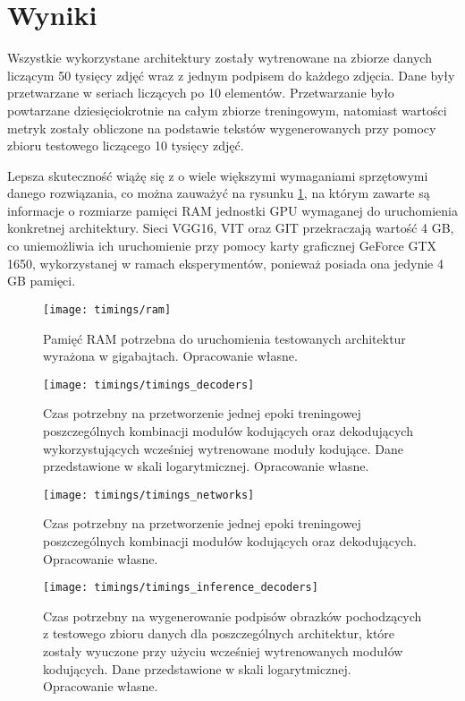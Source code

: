 \newpage %

\section{Wyniki}
Wszystkie wykorzystane architektury zostały wytrenowane na zbiorze danych liczącym 50 tysięcy zdjęć wraz z jednym podpisem do każdego zdjęcia. Dane były przetwarzane w seriach liczących po 10 elementów. Przetwarzanie było powtarzane dziesięciokrotnie na całym zbiorze treningowym, natomiast wartości metryk zostały obliczone na podstawie tekstów wygenerowanych przy pomocy zbioru testowego liczącego 10 tysięcy zdjęć.

Lepsza skuteczność wiążę się z o wiele większymi wymaganiami sprzętowymi danego rozwiązania, co można zauważyć na rysunku \ref{fig:memory}, na którym zawarte są informacje o rozmiarze pamięci RAM jednostki GPU wymaganej do uruchomienia konkretnej architektury. Sieci VGG16, VIT oraz GIT przekraczają wartość 4 GB, co uniemożliwia ich uruchomienie przy pomocy karty graficznej GeForce GTX 1650, wykorzystanej w ramach eksperymentów, ponieważ posiada ona jedynie 4 GB pamięci.
\begin{figure}[H]
  \centering
  \texttt{[image: timings/ram]}
  \caption{Pamięć RAM potrzebna do uruchomienia testowanych architektur wyrażona w gigabajtach. Opracowanie własne.}
  \label{fig:memory}
\end{figure}

\begin{figure}[H]
  \centering
  \texttt{[image: timings/timings\_decoders]}
  \caption{Czas potrzebny na przetworzenie jednej epoki treningowej poszczególnych kombinacji modułów kodujących oraz dekodujących wykorzystujących wcześniej wytrenowane moduły kodujące. Dane przedstawione w skali logarytmicznej. Opracowanie własne.}
  \label{fig:timings-decoders}
\end{figure}

\begin{figure}[H]
  \centering
  \texttt{[image: timings/timings\_networks]}
  \caption{Czas potrzebny na przetworzenie jednej epoki treningowej poszczególnych kombinacji modułów kodujących oraz dekodujących. Opracowanie własne.}
  \label{fig:timings-networks}
\end{figure}

\begin{figure}[H]
  \centering
  \texttt{[image: timings/timings\_inference\_decoders]}
  \caption{Czas potrzebny na wygenerowanie podpisów obrazków pochodzących z testowego zbioru danych dla poszczególnych architektur, które zostały wyuczone przy użyciu wcześniej wytrenowanych modułów kodujących. Dane przedstawione w skali logarytmicznej. Opracowanie własne.}
  \label{fig:timings-decoders-inference}
\end{figure}

